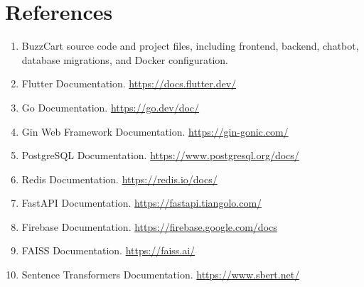 \documentclass[12pt,letterpaper]{report}
\begin{document}
\chapter*{References}

\begin{enumerate}
  \item BuzzCart source code and project files, including frontend, backend, chatbot, database migrations, and Docker configuration.
  \item Flutter Documentation. \url{https://docs.flutter.dev/}
  \item Go Documentation. \url{https://go.dev/doc/}
  \item Gin Web Framework Documentation. \url{https://gin-gonic.com/}
  \item PostgreSQL Documentation. \url{https://www.postgresql.org/docs/}
  \item Redis Documentation. \url{https://redis.io/docs/}
  \item FastAPI Documentation. \url{https://fastapi.tiangolo.com/}
  \item Firebase Documentation. \url{https://firebase.google.com/docs}
  \item FAISS Documentation. \url{https://faiss.ai/}
  \item Sentence Transformers Documentation. \url{https://www.sbert.net/}
\end{enumerate}
\end{document}

